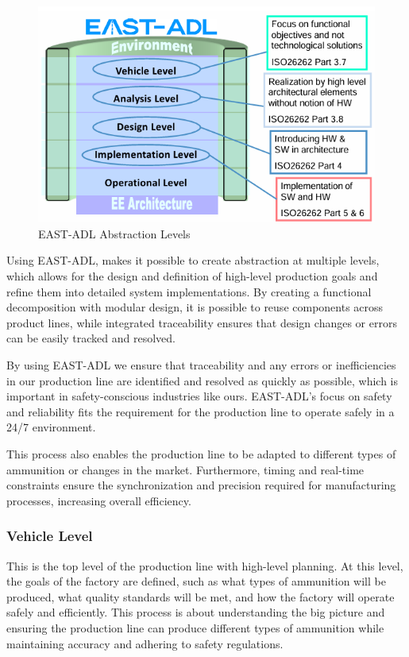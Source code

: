 \begin{figure}[H]
    \centering
    \caption{EAST-ADL Abstraction Levels}
    \label{fig:east-adl-levels}
    \includegraphics[width=1\linewidth]{report/GroupTemplate/images/EAST-ADL abstraction levels.png}
\end{figure}

Using EAST-ADL, makes it possible to create abstraction at multiple levels, which allows for the design and definition of high-level production goals and refine them into detailed system implementations. By creating a functional decomposition with modular design, it is possible to reuse components across product lines, while integrated traceability ensures that design changes or errors can be easily tracked and resolved.

By using EAST-ADL we ensure that traceability and any errors or inefficiencies in our production line are identified and resolved as quickly as possible, which is important in safety-conscious industries like ours. EAST-ADL’s focus on safety and reliability fits the requirement for the production line to operate safely in a 24/7 environment.

This process also enables the production line to be adapted to different types of ammunition or changes in the market. Furthermore, timing and real-time constraints ensure the synchronization and precision required for manufacturing processes, increasing overall efficiency.

\subsubsection{Vehicle Level}
This is the top level of the production line with high-level planning. At this level, the goals of the factory are defined, such as what types of ammunition will be produced, what quality standards will be met, and how the factory will operate safely and efficiently. This process is about understanding the big picture and ensuring the production line can produce different types of ammunition while maintaining accuracy and adhering to safety regulations.

